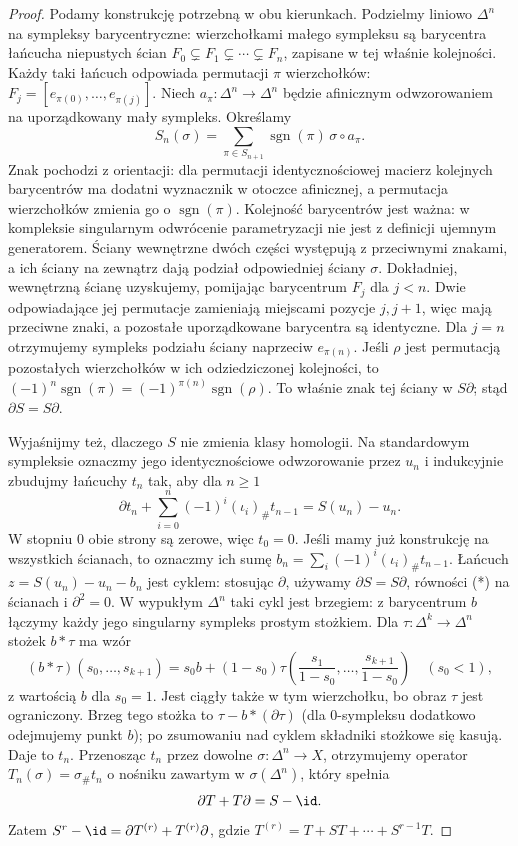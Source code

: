 \begin{proof}
Podamy konstrukcję potrzebną w obu kierunkach.
Podzielmy liniowo $\Delta^n$ na sympleksy
barycentryczne: wierzchołkami małego sympleksu
są barycentra łańcucha niepustych ścian
$F_0\subsetneq F_1\subsetneq\cdots\subsetneq F_n$,
zapisane w tej właśnie kolejności. Każdy taki łańcuch odpowiada
permutacji $\pi$ wierzchołków: $F_j=[e_{\pi(0)},\ldots,e_{\pi(j)}]$.
Niech $a_\pi:\Delta^n\to\Delta^n$ będzie afinicznym odwzorowaniem
na uporządkowany mały sympleks. Określamy
\[
 S_n(\sigma)=\sum_{\pi\in S_{n+1}}\operatorname{sgn}(\pi)
                 \,\sigma\circ a_\pi.
\]
Znak pochodzi z orientacji: dla permutacji identycznościowej
macierz kolejnych barycentrów ma dodatni wyznacznik w otoczce afinicznej,
a permutacja wierzchołków zmienia go o $\operatorname{sgn}(\pi)$.
Kolejność barycentrów jest ważna: w kompleksie singularnym
odwrócenie parametryzacji nie jest z definicji ujemnym generatorem.
Ściany wewnętrzne dwóch części
występują z przeciwnymi znakami,
a ich ściany na zewnątrz dają
podział odpowiedniej ściany $\sigma$.
Dokładniej, wewnętrzną ścianę uzyskujemy, pomijając barycentrum $F_j$
dla $j<n$. Dwie odpowiadające jej permutacje zamieniają miejscami
pozycje $j,j+1$, więc mają przeciwne znaki, a pozostałe
uporządkowane barycentra są identyczne. Dla $j=n$ otrzymujemy
sympleks podziału ściany naprzeciw $e_{\pi(n)}$.
Jeśli $\rho$ jest permutacją pozostałych wierzchołków w ich
odziedziczonej kolejności, to
$(-1)^n\operatorname{sgn}(\pi)=(-1)^{\pi(n)}\operatorname{sgn}(\rho)$.
To właśnie znak tej ściany w $S\partial$; stąd $\partial S=S\partial$.

Wyjaśnijmy też, dlaczego $S$ nie zmienia
klasy homologii. Na standardowym sympleksie
oznaczmy jego identycznościowe odwzorowanie
przez $u_n$ i indukcyjnie zbudujmy
łańcuchy $t_n$ tak, aby dla $n\geq1$
\[
 \partial t_n+\sum_{i=0}^n(-1)^i(\iota_i)_\#t_{n-1}
       =S(u_n)-u_n. \tag{*}
\]
W stopniu $0$ obie strony są zerowe,
więc $t_0=0$. Jeśli mamy już konstrukcję
na wszystkich ścianach, to oznaczmy ich sumę
$b_n=\sum_i(-1)^i(\iota_i)_\#t_{n-1}$.
Łańcuch $z=S(u_n)-u_n-b_n$
jest cyklem: stosując $\partial$,
używamy $\partial S=S\partial$,
równości (*) na ścianach
i $\partial^2=0$.
W wypukłym $\Delta^n$ taki cykl jest
brzegiem: z barycentrum $b$ łączymy
każdy jego singularny sympleks prostym
stożkiem. Dla $\tau:\Delta^k\to\Delta^n$ stożek $b*\tau$
ma wzór
\[
 (b*\tau)(s_0,\ldots,s_{k+1})
 =s_0b+(1-s_0)\tau\left(\frac{s_1}{1-s_0},\ldots,
                         \frac{s_{k+1}}{1-s_0}\right)
 \quad(s_0<1),
\]
z wartością $b$ dla $s_0=1$. Jest ciągły także w tym wierzchołku,
bo obraz $\tau$ jest ograniczony. Brzeg tego stożka to
$\tau-b*(\partial\tau)$ (dla $0$-sympleksu
dodatkowo odejmujemy punkt $b$);
po zsumowaniu nad cyklem składniki
stożkowe się kasują. Daje to $t_n$.
Przenosząc $t_n$ przez dowolne
$\sigma:\Delta^n\to X$, otrzymujemy
operator $T_n(\sigma)=\sigma_\#t_n$ o nośniku zawartym
w $\sigma(\Delta^n)$, który spełnia
\[
 \partial T+T\partial=S-\id.
\]
Zatem $S^r-\id=\partial T^{(r)}+
T^{(r)}\partial$, gdzie
$T^{(r)}=T+ST+\cdots+S^{r-1}T$.


\end{proof}
